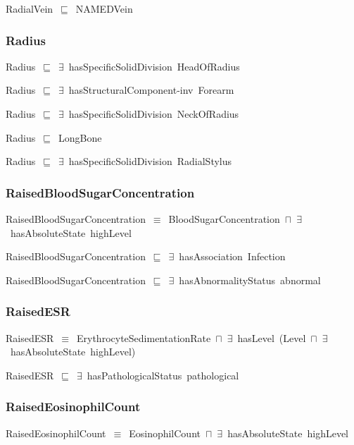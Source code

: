 \documentclass{article}
\begin{document}
RadialVein~\ensuremath{\sqsubseteq}~NAMEDVein~

\subsubsection*{Radius}

Radius~\ensuremath{\sqsubseteq}~\ensuremath{\exists}~hasSpecificSolidDivision~HeadOfRadius~

Radius~\ensuremath{\sqsubseteq}~\ensuremath{\exists}~hasStructuralComponent-inv~Forearm~

Radius~\ensuremath{\sqsubseteq}~\ensuremath{\exists}~hasSpecificSolidDivision~NeckOfRadius~

Radius~\ensuremath{\sqsubseteq}~LongBone~

Radius~\ensuremath{\sqsubseteq}~\ensuremath{\exists}~hasSpecificSolidDivision~RadialStylus~

\subsubsection*{RaisedBloodSugarConcentration}

RaisedBloodSugarConcentration~\ensuremath{\equiv}~BloodSugarConcentration~\ensuremath{\sqcap}~\ensuremath{\exists}~hasAbsoluteState~highLevel

RaisedBloodSugarConcentration~\ensuremath{\sqsubseteq}~\ensuremath{\exists}~hasAssociation~Infection~

RaisedBloodSugarConcentration~\ensuremath{\sqsubseteq}~\ensuremath{\exists}~hasAbnormalityStatus~abnormal~

\subsubsection*{RaisedESR}

RaisedESR~\ensuremath{\equiv}~ErythrocyteSedimentationRate~\ensuremath{\sqcap}~\ensuremath{\exists}~hasLevel~(Level~\ensuremath{\sqcap}~\ensuremath{\exists}~hasAbsoluteState~highLevel)

RaisedESR~\ensuremath{\sqsubseteq}~\ensuremath{\exists}~hasPathologicalStatus~pathological~

\subsubsection*{RaisedEosinophilCount}

RaisedEosinophilCount~\ensuremath{\equiv}~EosinophilCount~\ensuremath{\sqcap}~\ensuremath{\exists}~hasAbsoluteState~highLevel
\end{document}
